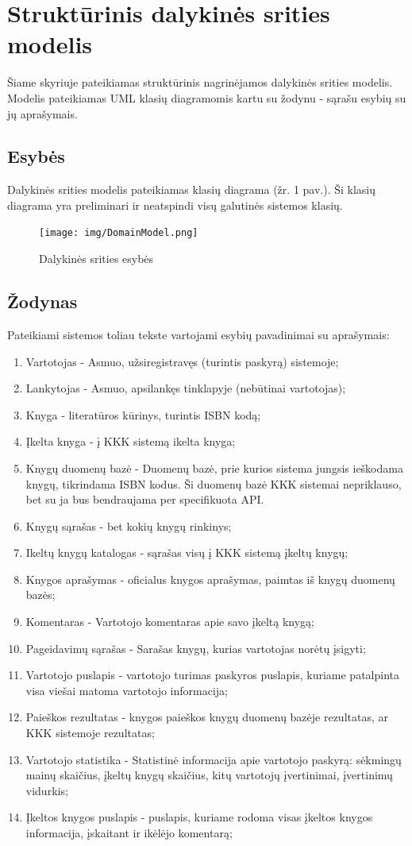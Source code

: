 \documentclass{VUMIFPSkursinis}
\begin{document}
\section{Struktūrinis dalykinės srities modelis}
	Šiame skyriuje pateikiamas struktūrinis nagrinėjamos dalykinės srities modelis. 
	Modelis pateikiamas UML klasių diagramomis kartu su žodynu - sąrašu esybių su jų aprašymais. 
	\subsection{Esybės}
		Dalykinės srities modelis pateikiamas klasių diagrama (žr. 1 pav.). Ši klasių diagrama yra
		preliminari ir neatspindi visų galutinės sistemos klasių.
		\begin{figure}[H]
			\centering
			\texttt{[image: img/DomainModel.png]}
			\caption{Dalykinės srities esybės}
			\label{img:psi2-domain-model}
		\end{figure}

	\subsection{Žodynas}
		Pateikiami sistemos toliau tekste vartojami esybių pavadinimai su aprašymais:
		\begin{enumerate}[label=\textbf{E\arabic*.}]
			\item Vartotojas - Asmuo, užsiregistravęs (turintis paskyrą) sistemoje;
			\item Lankytojas - Asmuo, apsilankęs tinklapyje (nebūtinai vartotojas);
			\item Knyga - literatūros kūrinys, turintis ISBN kodą;
			\item Įkelta knyga - į KKK sistemą ikelta knyga;
			\item Knygų duomenų bazė - Duomenų bazė, prie kurios sistema jungsis ieškodama knygų, tikrindama ISBN kodus. 
				Ši duomenų bazė KKK sistemai nepriklauso, bet su ja bus bendraujama per specifikuota API.
			\item Knygų sąrašas - bet kokių knygų rinkinys;
			\item Ikeltų knygų katalogas - sąrašas visų į KKK sistemą įkeltų knygų;
			\item Knygos aprašymas - oficialus knygos aprašymas, paimtas iš knygų duomenų bazės;
			\item Komentaras - Vartotojo komentaras apie savo įkeltą knygą;
			\item Pageidavimų sąrašas - Sarašas knygų, kurias vartotojas norėtų įsigyti;
			\item Vartotojo puslapis - vartotojo turimas paskyros puslapis, kuriame patalpinta visa viešai matoma vartotojo informacija;
			\item Paieškos rezultatas - knygos paieškos knygų duomenų bazėje rezultatas, ar KKK sistemoje rezultatas;
			\item Vartotojo statistika - Statistinė informacija apie vartotojo paskyrą: sėkmingų mainų skaičius, įkeltų knygų skaičius,
				kitų vartotojų įvertinimai, įvertinimų vidurkis;
			\item Įkeltos knygos puslapis - puslapis, kuriame rodoma visas įkeltos knygos informacija, įskaitant ir ikėlėjo komentarą;
		\end{enumerate}
\end{document}
